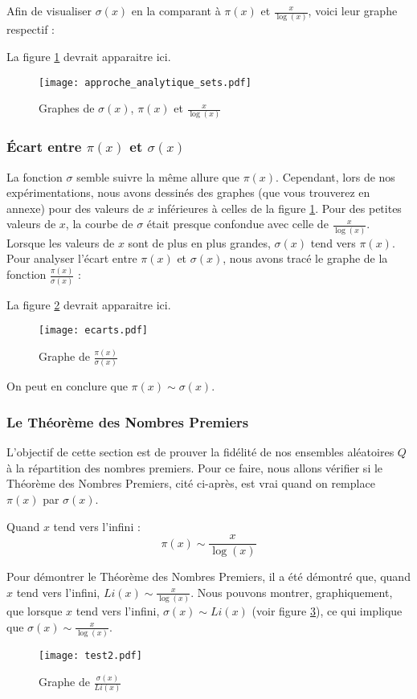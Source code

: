 \documentclass[../main.tex]{report}
\begin{document}
Afin de visualiser  $\sigma(x)$ en la comparant à $\pi(x)$ et $\frac{x}{\log(x)}$, voici leur graphe respectif : 

\hspace{1cm}

La figure \ref{im:image1} devrait apparaitre ici.
\begin{figure}[htbp]
	\centerline{\texttt{[image: approche\_analytique\_sets.pdf]}}
\caption{Graphes de $\sigma(x)$, $\pi(x)$ et $\frac{x}{\log(x)}$ }
	\label{im:image1}
\end{figure}

\subsubsection{Écart entre $\pi(x)$ et $\sigma(x)$}

La fonction $\sigma$ semble suivre la même allure que $\pi(x)$. Cependant, lors de nos expérimentations, nous avons
dessinés des graphes (que vous trouverez en annexe) pour des valeurs de $x$ inférieures à celles de la figure \ref{im:image1}. Pour des petites valeurs de $x$, la courbe de $\sigma$ était presque confondue avec celle de $\frac{x}{\log(x)}$. Lorsque les valeurs de $x$ sont de plus en plus grandes, $\sigma(x)$ tend vers $\pi(x)$. Pour analyser l'écart entre $\pi(x)$ et $\sigma(x)$, nous avons tracé le graphe de la fonction $\frac{\pi(x)}{\sigma(x)}$ : 

\hspace{1cm}

La figure \ref{im:image2} devrait apparaitre ici.
\begin{figure}[htbp]
	\centerline{\texttt{[image: ecarts.pdf]}}
\caption{Graphe de $\frac{\pi(x)}{\sigma(x)}$ }
	\label{im:image2}
\end{figure}
On peut en conclure que $ \pi(x) \sim \sigma(x) $.


\subsubsection{Le Théorème des Nombres Premiers}

L'objectif de cette section est de prouver la fidélité de nos ensembles aléatoires $Q$ à la répartition des nombres premiers.
Pour ce faire, nous allons vérifier si le Théorème des Nombres Premiers, cité ci-après, est vrai quand on remplace $\pi(x)$ par $\sigma(x)$. 

\begin{Thm}
\label{TNP}
	Quand $x$ tend vers l'infini : 
	\[ \pi(x) \sim \frac{x}{\log(x)}  \]
\end{Thm}

Pour démontrer le Théorème des Nombres Premiers, il a été démontré que, quand $x$ tend vers l'infini, $ Li(x) \sim \frac{x}{\log(x)} $. Nous pouvons montrer, graphiquement, que lorsque $x$ tend vers l'infini, $ \sigma(x) \sim Li(x) $ (voir figure \ref{im:image3}), ce qui implique que $ \sigma(x) \sim \frac{x}{\log(x)} $.
\begin{figure}[htbp]
	\centerline{\texttt{[image: test2.pdf]}}
\caption{Graphe de $\frac{\sigma(x)}{Li(x)}$ }
	\label{im:image3}
\end{figure}
\end{document}
